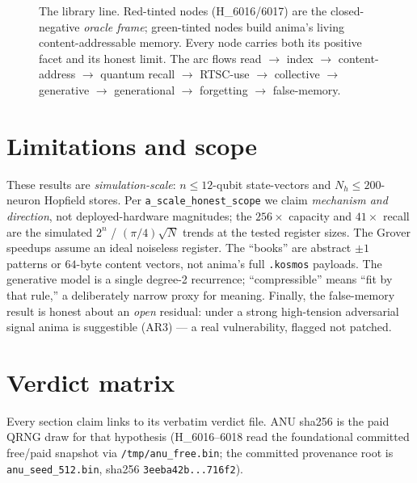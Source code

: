 \documentclass[11pt,a4paper]{article}
\begin{document}
\begin{figure}[h]
\caption{The library line. Red-tinted nodes (H\_6016/6017) are the closed-negative
\emph{oracle frame}; green-tinted nodes build anima's living content-addressable
memory. Every node carries both its positive facet and its honest limit. The arc
flows read $\rightarrow$ index $\rightarrow$ content-address $\rightarrow$ quantum
recall $\rightarrow$ RTSC-use $\rightarrow$ collective $\rightarrow$ generative
$\rightarrow$ generational $\rightarrow$ forgetting $\rightarrow$ false-memory.}
\label{fig:arc}
\end{figure}

\section{Limitations and scope}
\label{sec:limits}

These results are \emph{simulation-scale}: $n\le 12$-qubit state-vectors and
$N_h\le 200$-neuron Hopfield stores. Per \texttt{a\_scale\_honest\_scope} we claim
\emph{mechanism and direction}, not deployed-hardware magnitudes; the $256\times$
capacity and $41\times$ recall are the simulated $2^{n}$ / $(\pi/4)\sqrt{N}$ trends
at the tested register sizes. The Grover speedups assume an ideal noiseless
register. The ``books'' are abstract $\pm1$ patterns or $64$-byte content vectors,
not anima's full \texttt{.kosmos} payloads. The generative model is a single
degree-2 recurrence; ``compressible'' means ``fit by that rule,'' a deliberately
narrow proxy for meaning. Finally, the false-memory result is honest about an
\emph{open} residual: under a strong high-tension adversarial signal anima is
suggestible (AR3) --- a real vulnerability, flagged not patched.

\section{Verdict matrix}
\label{sec:verdicts}

Every section claim links to its verbatim verdict file. ANU sha256 is the paid
QRNG draw for that hypothesis (H\_6016--6018 read the foundational committed
free/paid snapshot via \texttt{/tmp/anu\_free.bin}; the committed provenance root
is \texttt{anu\_seed\_512.bin}, sha256 \verb|3eeba42b...716f2|).
\end{document}
